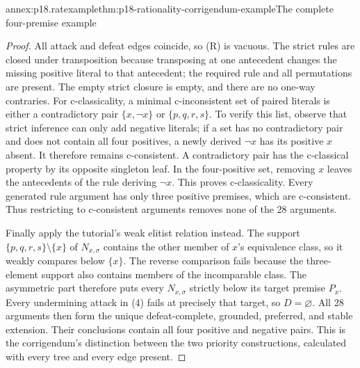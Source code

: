\begin{annexitem}{annex:p18.ratexample}{thm:p18-rationality-corrigendum-example}{The complete four-premise example}
\begin{proof}
All attack and defeat edges coincide, so (R) is vacuous.
The strict rules are closed under transposition because transposing at
one antecedent changes the missing positive literal to that antecedent;
the required rule and all permutations are present.
The empty strict closure is empty, and there are no one-way contraries.
For c-classicality, a minimal c-inconsistent set of paired literals is
either a contradictory pair \(\{x,\neg x\}\) or
\(\{p,q,r,s\}\). To verify this list, observe that strict inference can
only add negative literals; if a set has no contradictory pair and does
not contain all four positives, a newly derived \(\neg x\) has its
positive \(x\) absent. It therefore remains c-consistent.
A contradictory pair has the c-classical property by its opposite
singleton leaf. In the four-positive set, removing \(x\) leaves the
antecedents of the rule deriving \(\neg x\). This proves c-classicality.
Every generated rule argument has only three positive premises, which
are c-consistent. Thus restricting to c-consistent arguments removes
none of the 28 arguments.

Finally apply the tutorial's weak elitist relation instead.
The support \(\{p,q,r,s\}\setminus\{x\}\) of \(N_{x,\sigma}\)
contains the other member of \(x\)'s equivalence class, so it weakly
compares below \(\{x\}\). The reverse comparison fails because the
three-element support also contains members of the incomparable class.
The asymmetric part therefore puts every \(N_{x,\sigma}\) strictly
below its target premise \(P_x\). Every undermining attack in (4)
fails at precisely that target, so \(D=\varnothing\).
All 28 arguments then form the unique defeat-complete, grounded,
preferred, and stable extension. Their conclusions contain all four
positive and negative pairs. This is the corrigendum's distinction
between the two priority constructions, calculated with every tree
and every edge present.
\end{proof}
\end{annexitem}

